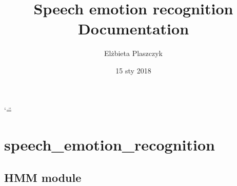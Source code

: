 \documentclass[letterpaper,10pt,polish]{sphinxmanual}
\title{Speech emotion recognition Documentation}
\date{15 sty 2018}
\author{Elżbieta Plaszczyk}
\begin{document}
\ifnum\catcode`\"=\active{}\fi
\maketitle
\sphinxtableofcontents
{}\label{\detokenize{index::doc}}



\chapter{speech\_emotion\_recognition}
\label{\detokenize{modules::doc}}\label{\detokenize{modules:speech-emotion-recognition}}\label{\detokenize{modules:welcome-to-y-s-documentation}}

\section{HMM module}
\label{\detokenize{HMM:hmm-module}}\label{\detokenize{HMM::doc}}\label{\detokenize{HMM:module-HMM}}
\end{document}
